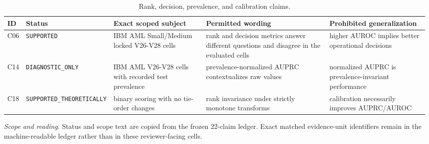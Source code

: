 \begin{table}[tbp]
\centering
\footnotesize
\setlength{\tabcolsep}{3.2pt}
\renewcommand{\arraystretch}{1.12}
\caption{Rank, decision, prevalence, and calibration claims.}
\label{tab:s-claims-decision}
\begin{tabularx}{\textwidth}{@{}l >{\raggedright\arraybackslash}p{} Y Y Y@{}}
\toprule
\textbf{ID} & \textbf{Status} & \textbf{Exact scoped subject} & \textbf{Permitted wording} & \textbf{Prohibited generalization} \\
\midrule
C06 & \texttt{SUPPORTED} & IBM AML Small/Medium locked V26-V28 cells & rank and decision metrics answer different questions and disagree in the evaluated cells & higher AUROC implies better operational decisions \\
C14 & \texttt{DIAGNOSTIC\_\allowbreak{}ONLY} & IBM AML V26-V28 cells with recorded test prevalence & prevalence-normalized AUPRC contextualizes raw values & normalized AUPRC is prevalence-invariant performance \\
C18 & \texttt{SUPPORTED\_\allowbreak{}THEORETICALLY} & binary scoring with no tie-order changes & rank invariance under strictly monotone transforms & calibration necessarily improves AUPRC/AUROC \\
\bottomrule
\end{tabularx}
\vspace{2pt}
\begin{minipage}{\textwidth}\footnotesize\emph{Scope and reading.} Status and scope text are copied from the frozen 22-claim ledger. Exact matched evidence-unit identifiers remain in the machine-readable ledger rather than in these reviewer-facing cells.\end{minipage}
\end{table}
